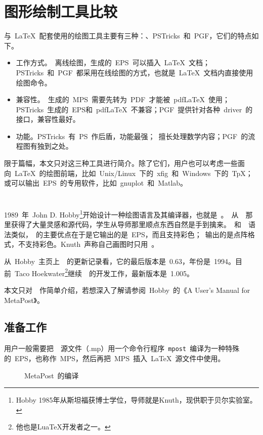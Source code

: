 \section{图形绘制工具比较}
与~\LaTeX~配套使用的绘图工具主要有三种：\MP、PSTricks~和~PGF，它们的特点如下。

\begin{itemize}
\item 工作方式。\MP~离线绘图，生成的~EPS~可以插入~\LaTeX~文档；PSTricks~和~PGF~都采用在线绘图的方式，也就是~\LaTeX~文档内直接使用绘图命令。
\item 兼容性。\MP~生成的~MPS~需要先转为~PDF~才能被~pdf\LaTeX~使用；PSTricks~生成的~EPS和~pdf\LaTeX~不兼容；PGF~提供针对各种~driver~的接口，兼容性最好。
\item 功能。PSTricks~有~PS~作后盾，功能最强；\MP~擅长处理数学内容；PGF~的流程图有独到之处。
\end{itemize}

限于篇幅，本文只对这三种工具进行简介。除了它们，用户也可以考虑一些面向~\LaTeX~的绘图前端，比如~Unix/Linux~下的~xfig~和~Windows~下的~TpX；或可以输出~EPS~的专用软件，比如~gnuplot~和~Matlab。

\section{\MP}
\label{sec:mp}

1989~年~John D. Hobby\footnote{Hobby 1985年从斯坦福获博士学位，导师就是Knuth，现供职于贝尔实验室。}开始设计一种绘图语言及其编译器，也就是~\MP。\MP~从~\MF~那里获得了大量灵感和源代码，学生从导师那里顺点东西自然是手到擒来。\MP~和~\MF~语法类似，\MP~的主要优点在于是它输出的是~EPS，而且支持彩色；\MF~输出的是点阵格式，不支持彩色。Knuth~声称自己画图时只用~\MP。

从~Hobby~主页上~\MP~的更新记录看，它的最后版本是~0.63，年份是~1994。目前~Taco Hoekwater\footnote{他也是LuaTeX开发者之一。}继续~\MP~的开发工作，最新版本是~1.005。

本文只对~\MP~作简单介绍，若想深入了解请参阅~Hobby~的《A User's Manual for MetaPost》\citep{Hobby_2007}。

\subsection{准备工作}
用户一般需要把~\MP~源文件（.mp）用一个命令行程序~\verb|mpost|~编译为一种特殊的~EPS，也称作~MPS，然后再把~MPS~插入~\LaTeX~源文件中使用。
\begin{figure}[htbp]
\centering
{}
\caption{MetaPost~的编译}
\label{fig:mp}
\end{figure}

